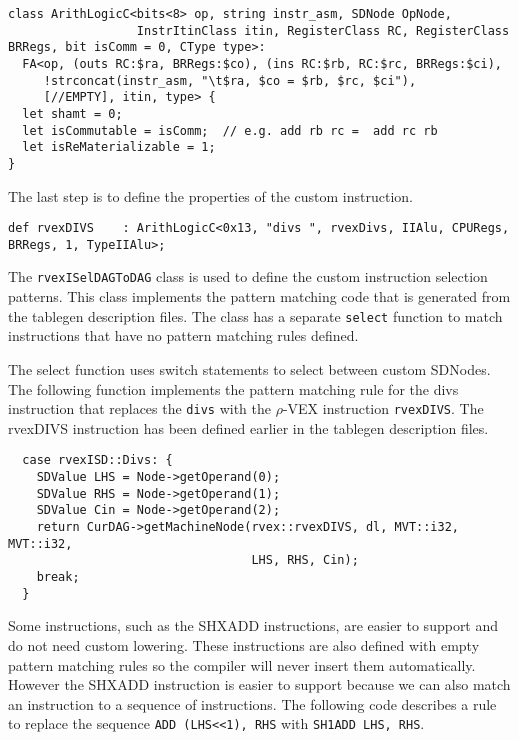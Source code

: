 \begin{lstlisting}
class ArithLogicC<bits<8> op, string instr_asm, SDNode OpNode,
                  InstrItinClass itin, RegisterClass RC, RegisterClass BRRegs, bit isComm = 0, CType type>:
  FA<op, (outs RC:$ra, BRRegs:$co), (ins RC:$rb, RC:$rc, BRRegs:$ci),
     !strconcat(instr_asm, "\t$ra, $co = $rb, $rc, $ci"),
     [//EMPTY], itin, type> {
  let shamt = 0;
  let isCommutable = isComm;  // e.g. add rb rc =  add rc rb
  let isReMaterializable = 1;
}
\end{lstlisting}

The last step is to define the properties of the custom instruction.

\begin{lstlisting}
def rvexDIVS    : ArithLogicC<0x13, "divs ", rvexDivs, IIAlu, CPURegs, BRRegs, 1, TypeIIAlu>;
\end{lstlisting}

The \texttt{rvexISelDAGToDAG} class is used to define the custom instruction selection patterns. This class implements the pattern matching code that is generated from the tablegen description files. The class has a separate \texttt{select} function to match instructions that have no pattern matching rules defined.

The select function uses switch statements to select between custom SDNodes. The following function implements the pattern matching rule for the divs instruction that replaces the \texttt{divs} with the $\rho$-VEX instruction \texttt{rvexDIVS}. The rvexDIVS instruction has been defined earlier in the tablegen description files.

\begin{lstlisting}   
  case rvexISD::Divs: {
    SDValue LHS = Node->getOperand(0);
    SDValue RHS = Node->getOperand(1);
    SDValue Cin = Node->getOperand(2);
    return CurDAG->getMachineNode(rvex::rvexDIVS, dl, MVT::i32, MVT::i32,
                                  LHS, RHS, Cin);
    break;
  }
\end{lstlisting}

Some instructions, such as the SHXADD instructions, are easier to support and do not need custom lowering. These instructions are also defined with empty pattern matching rules so the compiler will never insert them automatically. However the SHXADD instruction is easier to support because we can also match an instruction to a sequence of instructions. The following code describes a rule to replace the sequence \texttt{ADD (LHS\textless\textless1), RHS} with \texttt{SH1ADD LHS, RHS}.

